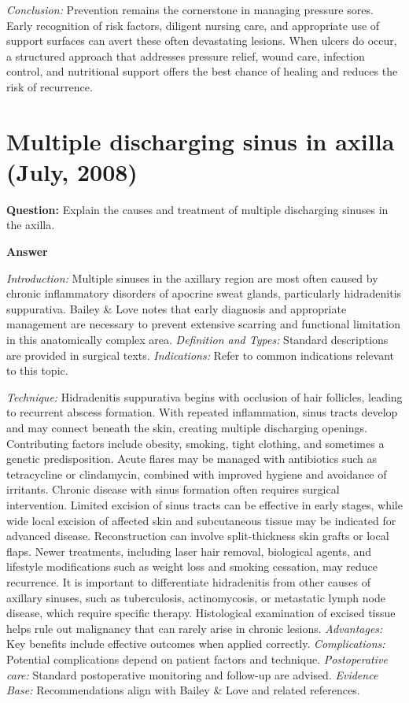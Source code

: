 \documentclass{article}
\begin{document}
\emph{Conclusion:} Prevention remains the cornerstone in managing pressure sores. Early recognition of risk factors, diligent nursing care, and appropriate use of support surfaces can avert these often devastating lesions. When ulcers do occur, a structured approach that addresses pressure relief, wound care, infection control, and nutritional support offers the best chance of healing and reduces the risk of recurrence.


\section{Multiple discharging sinus in axilla (July, 2008)}

\textbf{Question:} Explain the causes and treatment of multiple discharging sinuses in the axilla.

\textbf{Answer}

\emph{Introduction:} Multiple sinuses in the axillary region are most often caused by chronic inflammatory disorders of apocrine sweat glands, particularly hidradenitis suppurativa. Bailey & Love notes that early diagnosis and appropriate management are necessary to prevent extensive scarring and functional limitation in this anatomically complex area.
\emph{Definition and Types:} Standard descriptions are provided in surgical texts.
\emph{Indications:} Refer to common indications relevant to this topic.

\emph{Technique:} Hidradenitis suppurativa begins with occlusion of hair follicles, leading to recurrent abscess formation. With repeated inflammation, sinus tracts develop and may connect beneath the skin, creating multiple discharging openings. Contributing factors include obesity, smoking, tight clothing, and sometimes a genetic predisposition. Acute flares may be managed with antibiotics such as tetracycline or clindamycin, combined with improved hygiene and avoidance of irritants. Chronic disease with sinus formation often requires surgical intervention. Limited excision of sinus tracts can be effective in early stages, while wide local excision of affected skin and subcutaneous tissue may be indicated for advanced disease. Reconstruction can involve split-thickness skin grafts or local flaps. Newer treatments, including laser hair removal, biological agents, and lifestyle modifications such as weight loss and smoking cessation, may reduce recurrence. It is important to differentiate hidradenitis from other causes of axillary sinuses, such as tuberculosis, actinomycosis, or metastatic lymph node disease, which require specific therapy. Histological examination of excised tissue helps rule out malignancy that can rarely arise in chronic lesions.
\emph{Advantages:} Key benefits include effective outcomes when applied correctly.
\emph{Complications:} Potential complications depend on patient factors and technique.
\emph{Postoperative care:} Standard postoperative monitoring and follow-up are advised.
\emph{Evidence Base:} Recommendations align with Bailey & Love and related references.
\end{document}

